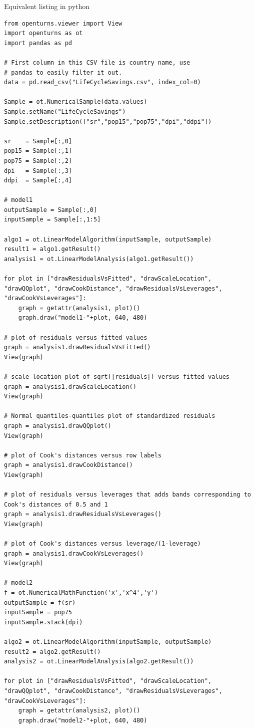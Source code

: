 Equivalent listing in python
\begin{lstlisting}[style=pythonStyle]
from openturns.viewer import View
import openturns as ot
import pandas as pd

# First column in this CSV file is country name, use
# pandas to easily filter it out.
data = pd.read_csv("LifeCycleSavings.csv", index_col=0)

Sample = ot.NumericalSample(data.values)
Sample.setName("LifeCycleSavings")
Sample.setDescription(["sr","pop15","pop75","dpi","ddpi"])

sr    = Sample[:,0]
pop15 = Sample[:,1]
pop75 = Sample[:,2]
dpi   = Sample[:,3]
ddpi  = Sample[:,4]

# model1
outputSample = Sample[:,0]
inputSample = Sample[:,1:5]

algo1 = ot.LinearModelAlgorithm(inputSample, outputSample)
result1 = algo1.getResult()
analysis1 = ot.LinearModelAnalysis(algo1.getResult())

for plot in ["drawResidualsVsFitted", "drawScaleLocation", "drawQQplot", "drawCookDistance", "drawResidualsVsLeverages", "drawCookVsLeverages"]:
    graph = getattr(analysis1, plot)()
    graph.draw("model1-"+plot, 640, 480)

# plot of residuals versus fitted values
graph = analysis1.drawResidualsVsFitted()
View(graph)

# scale-location plot of sqrt(|residuals|) versus fitted values
graph = analysis1.drawScaleLocation()
View(graph)

# Normal quantiles-quantiles plot of standardized residuals
graph = analysis1.drawQQplot()
View(graph)

# plot of Cook's distances versus row labels
graph = analysis1.drawCookDistance()
View(graph)

# plot of residuals versus leverages that adds bands corresponding to Cook's distances of 0.5 and 1
graph = analysis1.drawResidualsVsLeverages()
View(graph)

# plot of Cook's distances versus leverage/(1-leverage)
graph = analysis1.drawCookVsLeverages()
View(graph)

# model2
f = ot.NumericalMathFunction('x','x^4','y')
outputSample = f(sr)
inputSample = pop75
inputSample.stack(dpi)

algo2 = ot.LinearModelAlgorithm(inputSample, outputSample)
result2 = algo2.getResult()
analysis2 = ot.LinearModelAnalysis(algo2.getResult())

for plot in ["drawResidualsVsFitted", "drawScaleLocation", "drawQQplot", "drawCookDistance", "drawResidualsVsLeverages", "drawCookVsLeverages"]:
    graph = getattr(analysis2, plot)()
    graph.draw("model2-"+plot, 640, 480)


\end{lstlisting}
